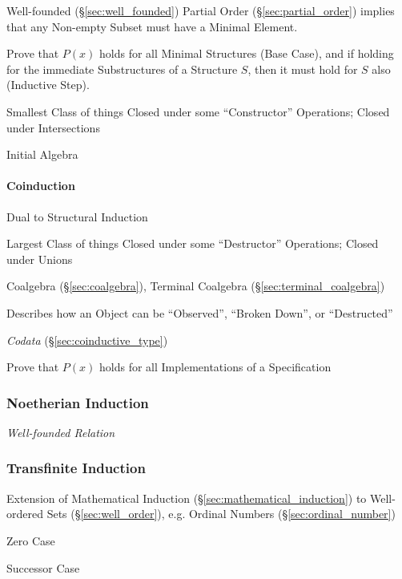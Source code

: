 Well-founded (\S\ref{sec:well_founded}) Partial Order
(\S\ref{sec:partial_order}) implies that any Non-empty Subset must
have a Minimal Element.

Prove that $P(x)$ holds for all Minimal Structures (Base Case), and if
holding for the immediate Substructures of a Structure $S$, then it
must hold for $S$ also (Inductive Step). %

Smallest Class of things Closed under some ``Constructor'' Operations;
Closed under Intersections \cite{shulman11}

Initial Algebra %



\paragraph{Coinduction}\label{sec:coinduction}\hfill

Dual to Structural Induction

Largest Class of things Closed under some ``Destructor'' Operations;
Closed under Unions \cite{shulman11}

Coalgebra (\S\ref{sec:coalgebra}), Terminal Coalgebra
(\S\ref{sec:terminal_coalgebra})

Describes how an Object can be ``Observed'', ``Broken Down'', or
``Destructed''

\emph{Codata} (\S\ref{sec:coinductive_type})

Prove that $P(x)$ holds for all Implementations of a Specification



\subsubsection{Noetherian Induction}\label{sec:noetherian_induction}

\emph{Well-founded Relation}



\subsubsection{Transfinite Induction}\label{sec:transfinite_induction}

Extension of Mathematical Induction
(\S\ref{sec:mathematical_induction}) to Well-ordered Sets
(\S\ref{sec:well_order}), e.g. Ordinal Numbers
(\S\ref{sec:ordinal_number})

Zero Case

Successor Case

